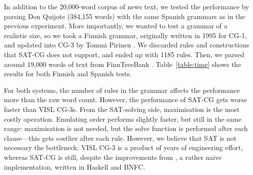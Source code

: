 In addition to the 20,000-word corpus of news text,
we tested the performance by parsing Don Quijote (384,155 words) with
the same Spanish grammars as in the previous experiment. 
%
%
More importantly, we wanted to test a grammar of a realistic size, 
so we took a Finnish grammar, originally written in 1995 for CG-1, 
and updated into CG-3 by Tommi Pirinen \cite{pirinen2015}.
We discarded rules and constructions that SAT-CG does not support, and ended up with
1185 rules. Then, we parsed around 19,000 words of text from FinnTreeBank \cite{voutilainen2011finntreebank}.
Table~\ref{table:time} shows the results for both Finnish and Spanish tests.

For both systems, the number of rules in the grammar affects the performance 
more than the raw word count.
However, the performance of SAT-CG gets worse faster than VISL CG-3s.
From the SAT-solving side, maximisation is the most costly operation. 
Emulating order performs slightly faster, but still in the same range: 
maximisation is not needed, but the solve function is performed after 
each clause---this gets costlier after each rule.
However, we believe that SAT is not necessary the bottleneck:
VISL CG-3 is a product of years of engineering effort, whereas SAT-CG
is still, despite the improvements from \cite{listenmaa_claessen2015},
a rather naive implementation, written in Haskell and BNFC.


